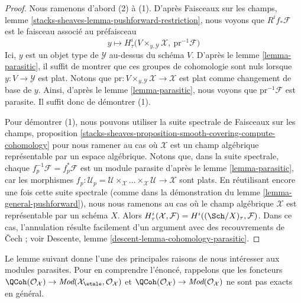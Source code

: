 \begin{proof}
Nous ramenons d'abord (2) à (1).
D'après Faisceaux sur les champs, lemme \ref{stacks-sheaves-lemma-pushforward-restriction},
nous voyons que $R^if_*\mathcal{F}$ est le faisceau associé au préfaisceau
$$
y \longmapsto
H^i_\tau\Big(V \times_{y, \mathcal{Y}} \mathcal{X},
\ \text{pr}^{-1}\mathcal{F}\Big)
$$
Ici, $y$ est un objet type de $\mathcal{Y}$ au-dessus du schéma $V$.
D'après le lemme \ref{lemma-parasitic}, il suffit de montrer que
ces groupes de cohomologie sont nuls lorsque $y : V \to \mathcal{Y}$ est plat.
Notons que $\text{pr} : V \times_{y, \mathcal{Y}} \mathcal{X} \to \mathcal{X}$
est plat comme changement de base de $y$. Ainsi, d'après le
lemme \ref{lemma-parasitic}, nous voyons que $\text{pr}^{-1}\mathcal{F}$
est parasite. Il suffit donc de démontrer (1).

\medskip\noindent
Pour démontrer (1), nous pouvons utiliser la suite spectrale de
Faisceaux sur les champs, proposition
\ref{stacks-sheaves-proposition-smooth-covering-compute-cohomology}
pour nous ramener au cas où $\mathcal{X}$
est un champ algébrique représentable par un espace algébrique.
Notons que, dans la suite spectrale, chaque
$f_p^{-1}\mathcal{F} = f_p^*\mathcal{F}$ est un module parasite d'après le
lemme \ref{lemma-parasitic}, car les morphismes
$f_p : \mathcal{U}_p =
\mathcal{U} \times_\mathcal{X} \ldots
\times_\mathcal{X} \mathcal{U} \to \mathcal{X}$ sont plats.
En réutilisant encore une fois cette suite spectrale (comme dans la
démonstration du lemme \ref{lemma-general-pushforward}),
nous nous ramenons au cas où le
champ algébrique $\mathcal{X}$ est représentable par un schéma $X$.
Alors $H^i_\tau(\mathcal{X}, \mathcal{F}) = H^i((\Sch/X)_\tau, \mathcal{F})$.
Dans ce cas, l'annulation résulte facilement d'un argument
avec des recouvrements de {\v C}ech ; voir
Descente, lemme \ref{descent-lemma-cohomology-parasitic}.
\end{proof}

\noindent
Le lemme suivant donne l'une des principales raisons de nous intéresser aux
modules parasites. Pour en comprendre l'énoncé, rappelons que les
foncteurs
$\QCoh(\mathcal{O}_\mathcal{X}) \to
\textit{Mod}(\mathcal{X}_\etale, \mathcal{O}_\mathcal{X})$
et
$\QCoh(\mathcal{O}_\mathcal{X}) \to
\textit{Mod}(\mathcal{O}_\mathcal{X})$
ne sont pas exacts en général.

